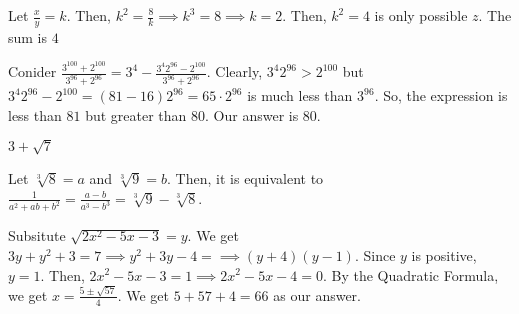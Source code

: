 \documentclass[11pt]{article}
\begin{document}

\begin{sol} 
Let $\frac{x}{y}=k$. Then, $k^2=\frac{8}{k}\implies k^3 = 8\implies k =2$. Then, $k^2=4$ is only possible $z$. The sum is $\boxed{4}$ 
\end{sol}


\begin{sol}
Conider $\frac{3^{100}+2^{100}}{3^{96}+2^{96}}=3^4-\frac{3^{4}2^{96}-2^{100}}{3^{96}+2^{96}}$. Clearly, $3^{4}2^{96}>2^{100}$ but $3^{4}2^{96}-2^{100}=(81-16)2^{96}=65\cdot 2^{96}$ is much less than $3^{96}$. So, the expression is less than $81$ but greater than $80$. Our answer is $\boxed{80}$.
\end{sol}


\begin{sol}
$3+\sqrt{7}$
\end{sol}


\begin{sol}
Let $\sqrt[3]{8}=a$ and $\sqrt[3]{9}=b$. Then, it is equivalent to $\frac{1}{a^2+ab+b^2}=\frac{a-b}{a^3-b^3}=\boxed{\sqrt[3]{9}-\sqrt[3]{8}}$.
\end{sol}


\begin{sol}
Subsitute $\sqrt{2x^2-5x-3}=y$. We get $3y+y^2+3=7\implies y^2+3y-4=\implies (y+4)(y-1)$. Since $y$ is positive, $y=1$. Then, $2x^2-5x-3=1\implies 2x^2-5x-4=0$. By the Quadratic Formula, we get $x=\frac{5 \pm \sqrt{57}}{4}$. We get $5+57+4=\boxed{66}$ as our answer.
\end{sol}

\end{document}
